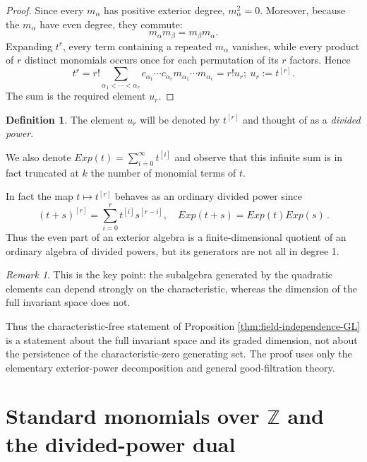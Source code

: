 \documentclass[10pt]{amsart}
\theoremstyle{definition}
\newtheorem{definition}[theorem]{Definition}
\theoremstyle{remark}
\newtheorem{remark}[theorem]{Remark}
\begin{document}
\begin{proof}
 
Since every \(m_\alpha\) has positive exterior degree,
$
m_\alpha^2=0.
$
Moreover, because the \(m_\alpha\) have even degree, they commute:
\[
m_\alpha m_\beta=m_\beta m_\alpha.
\]
Expanding \(t^r\), every term containing a repeated \(m_\alpha\)
vanishes, while every product of \(r\) distinct monomials occurs once
for each permutation of its \(r\) factors.  Hence
\begin{equation}\label{sedi}
t^r=r!
\sum_{\alpha_1<\cdots<\alpha_r}
c_{\alpha_1}\cdots c_{\alpha_r}
m_{\alpha_1}\cdots m_{\alpha_r}=r!u_r;\  u_r:=t^{[r]}.
\end{equation}
The sum is the required element \(u_r\).
\end{proof}
\begin{definition}\label{leld}
The element \(u_r\)  will be denoted by  $t^{[r]}$  and thought of as a {\em divided power}.\smallskip

We also denote  $Exp(t)=\sum_{i=0}^\infty  t  ^{[i]}$ and observe that this infinite sum is in fact truncated  at $k$ the number of monomial terms of $t$.
\end{definition} In fact the map $t\mapsto t^{[r]}$ behaves as an  ordinary divided power since 
 \begin{equation}\label{exp}
(t+s)^{[r]}=\sum_{i=0}^r  t ^{[i]} s ^{[r-i]},\quad  Exp (t+s) =Exp (t )Exp (s)\,.
\end{equation} Thus the even part of an exterior algebra  is a finite-dimensional quotient  of an ordinary algebra of divided powers, but its generators are not all in degree 1.

 
\begin{remark}

This is the key point: the subalgebra generated by the quadratic
elements can depend strongly on the characteristic, whereas the
dimension of the full invariant space does not.\smallskip

 
Thus the characteristic-free statement of Proposition \ref{thm:field-independence-GL} is a statement about
the full invariant space and its graded dimension, not about the persistence of
the characteristic-zero generating set. The proof uses only the elementary
exterior-power decomposition and general good-filtration theory.
\end{remark}



\section{Standard monomials over $\mathbb Z$ and the divided-power dual}
\end{document}
